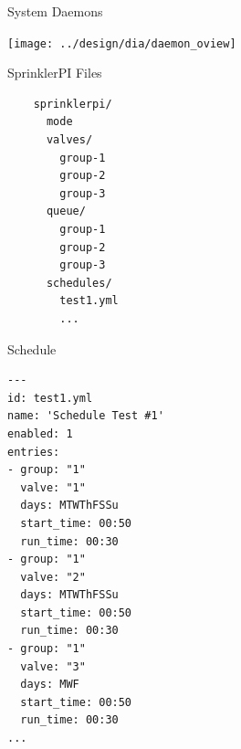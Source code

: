 \documentclass{article}
\begin{document}
\begin{center}
{}

\end{center}
\pagebreak

\begin{center}

{\fontsize{20}{80}\selectfont System Daemons} \\
\vspace*{0.5in}

\texttt{[image: ../design/dia/daemon\_oview]}

\end{center}

\vspace*{0.25in}

\begin{minipage}[t]{3in}
{\fontsize{14}{80}\selectfont SprinklerPI Files} \\
\begin{verbatim}
    sprinklerpi/
      mode
      valves/
        group-1
        group-2
        group-3
      queue/
        group-1
        group-2
        group-3
      schedules/
        test1.yml
        ...
\end{verbatim}
\end{minipage}
\begin{minipage}[t]{3in}
{\fontsize{15}{80}\selectfont Schedule} \\
\begin{verbatim}
---
id: test1.yml
name: 'Schedule Test #1'
enabled: 1
entries:
- group: "1"
  valve: "1"
  days: MTWThFSSu
  start_time: 00:50
  run_time: 00:30
- group: "1"
  valve: "2"
  days: MTWThFSSu
  start_time: 00:50
  run_time: 00:30
- group: "1"
  valve: "3"
  days: MWF
  start_time: 00:50
  run_time: 00:30
...
\end{verbatim}
\end{minipage}

\pagebreak
\end{document}
